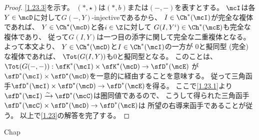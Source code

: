 \documentclass[uplatex,dvipdfmx]{jsarticle}
\begin{document}
\begin{proof}
  \ref{1.23.3}を示す。
  \((*,\star)\)は\((*,b)\)または\((-,-)\)を表すとする。
  \(\mcI\)は各\(Y\in \mcD\)に対して\(G(-,Y)\)-injectiveであるから、
  \(I\in \Ch^*(\mcI)\)が完全な複体であれば、
  \(Y\in \Ch^{\star}(\mcD)\)と各\(i\in \Z\)に対して
  \(G(I,Y^i)\in \Ch^*(\mcE)\)も完全な複体であり、
  従って\(G(I,Y)\)は一つ目の添字に関して完全な二重複体となる。
  よって本文\cite[Theorem 1.9.3]{kashiwara2002sheaves}より、
  \(Y\in \Ch^{\star}(\mcD)\)と\(I\in \Ch^*(\mcI)\)の一方が
  \(0\)と擬同型 (完全) な複体であれば、
  \(\Tot(G(I,Y))\)も\(0\)と擬同型となる。
  このことは、
  \(\Tot(G(-,-)):\sfK^*(\mcI) \times \sfK^{\star}(\mcD) \to \sfD^*(\mcE)\)
  が\(\sfD^*(\mcI) \times \sfD^{\star}(\mcD)\)を一意的に経由することを意味する。
  従って三角函手\(\sfD^*(\mcI) \times \sfD^{\star}(\mcD)\to \sfD^*(\mcE)\)を得る。
  ここで\ref{1.23.1}より
  \(\sfD^*(\mcI)\xrightarrow{\sim} \sfD^*(\mcC)\)は圏同値であるので、
  こうして得られた三角函手
  \(\sfD^*(\mcC)\times \sfD^{\star}(\mcD)\to \sfD^*(\mcE)\)は
  所望の右導来函手であることが従う。
  以上で\autoref{1.23}の解答を完了する。
\end{proof}





\ifcsname Chap\endcsname\else
\printbibliography
\end{document}
